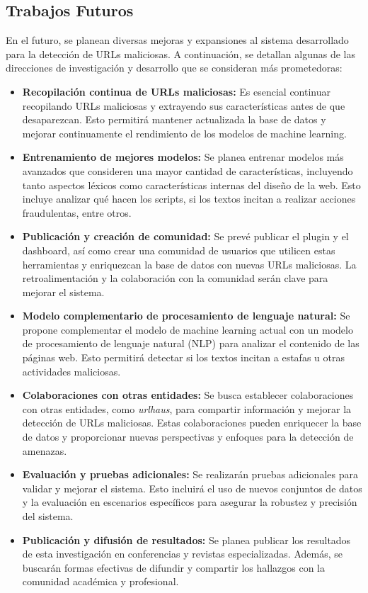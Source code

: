 \subsection{Trabajos Futuros}

En el futuro, se planean diversas mejoras y expansiones al sistema desarrollado para la detección de URLs maliciosas. A continuación, se detallan algunas de las direcciones de investigación y desarrollo que se consideran más prometedoras:

\begin{itemize}
    \item \textbf{Recopilación continua de URLs maliciosas:} Es esencial continuar recopilando URLs maliciosas y extrayendo sus características antes de que desaparezcan. Esto permitirá mantener actualizada la base de datos y mejorar continuamente el rendimiento de los modelos de machine learning.

    \item \textbf{Entrenamiento de mejores modelos:} Se planea entrenar modelos más avanzados que consideren una mayor cantidad de características, incluyendo tanto aspectos léxicos como características internas del diseño de la web. Esto incluye analizar qué hacen los scripts, si los textos incitan a realizar acciones fraudulentas, entre otros.

    \item \textbf{Publicación y creación de comunidad:} Se prevé publicar el plugin y el dashboard, así como crear una comunidad de usuarios que utilicen estas herramientas y enriquezcan la base de datos con nuevas URLs maliciosas. La retroalimentación y la colaboración con la comunidad serán clave para mejorar el sistema.

    \item \textbf{Modelo complementario de procesamiento de lenguaje natural:} Se propone complementar el modelo de machine learning actual con un modelo de procesamiento de lenguaje natural (NLP) para analizar el contenido de las páginas web. Esto permitirá detectar si los textos incitan a estafas u otras actividades maliciosas.

    \item \textbf{Colaboraciones con otras entidades:} Se busca establecer colaboraciones con otras entidades, como \textit{urlhaus}, para compartir información y mejorar la detección de URLs maliciosas. Estas colaboraciones pueden enriquecer la base de datos y proporcionar nuevas perspectivas y enfoques para la detección de amenazas.

    \item \textbf{Evaluación y pruebas adicionales:} Se realizarán pruebas adicionales para validar y mejorar el sistema. Esto incluirá el uso de nuevos conjuntos de datos y la evaluación en escenarios específicos para asegurar la robustez y precisión del sistema.

    \item \textbf{Publicación y difusión de resultados:} Se planea publicar los resultados de esta investigación en conferencias y revistas especializadas. Además, se buscarán formas efectivas de difundir y compartir los hallazgos con la comunidad académica y profesional.

\end{itemize}